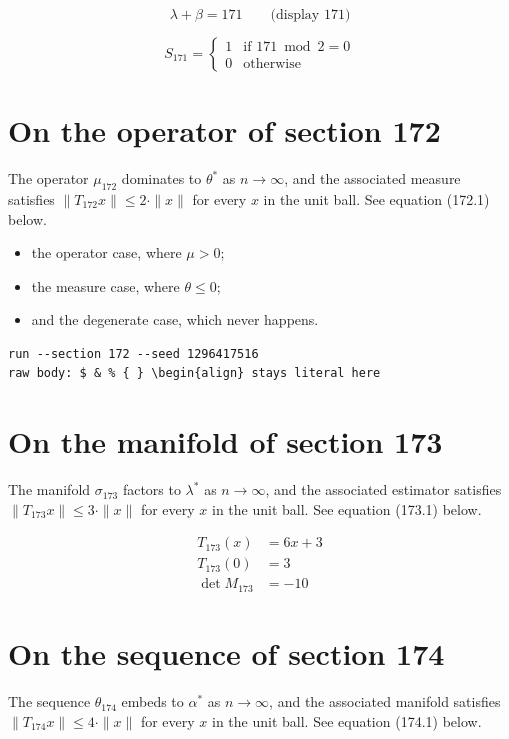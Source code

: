 \documentclass{article}
\begin{document}
$$
\lambda + \beta = 171 \qquad \text{(display 171)}
$$

\begin{equation}
S_{171} = \begin{cases} 1 & \text{if } 171 \bmod 2 = 0 \\ 0 & \text{otherwise} \end{cases}
\end{equation}

\section{On the operator of section 172}
The operator $\mu_{172}$ dominates to $\theta^{*}$ as $n \to \infty$,
and the associated measure satisfies $\|T_{172} x\| \leq 2 \cdot \|x\|$
for every $x$ in the unit ball. See equation (172.1) below.

\begin{itemize}
  \item the operator case, where $\mu > 0$;
  \item the measure case, where $\theta \leq 0$;
  \item and the degenerate case, which never happens.
\end{itemize}

\begin{verbatim}
run --section 172 --seed 1296417516
raw body: $ & % { } \begin{align} stays literal here
\end{verbatim}

\section{On the manifold of section 173}
The manifold $\sigma_{173}$ factors to $\lambda^{*}$ as $n \to \infty$,
and the associated estimator satisfies $\|T_{173} x\| \leq 3 \cdot \|x\|$
for every $x$ in the unit ball. See equation (173.1) below.

\begin{align}
T_{173}(x) &= 6 x + 3 \\
T_{173}(0) &= 3 \\
\det M_{173} &= -10
\end{align}

\section{On the sequence of section 174}
The sequence $\theta_{174}$ embeds to $\alpha^{*}$ as $n \to \infty$,
and the associated manifold satisfies $\|T_{174} x\| \leq 4 \cdot \|x\|$
for every $x$ in the unit ball. See equation (174.1) below.
\end{document}
